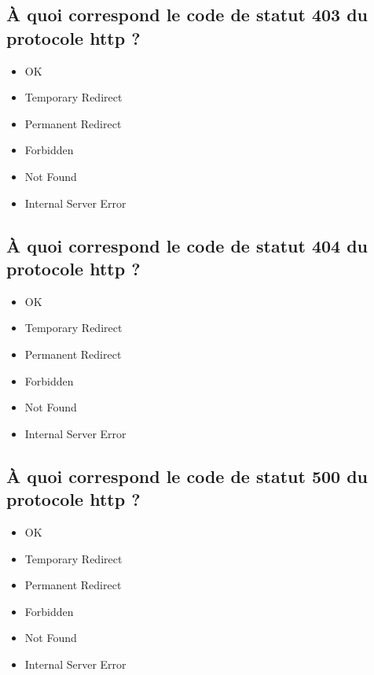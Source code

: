 \documentclass[11pt,a4paper]{article}
\begin{document}
\subsection{\`A quoi correspond le code de statut 403 du protocole http ?}

\begin{itemize}
\item[\CaseCoche] OK\\
\item[\CaseCoche] Temporary Redirect\\
\item[\CaseCoche] Permanent Redirect\\
\item[\CaseCoche] Forbidden\\  %
\item[\CaseCoche] Not Found\\
\item[\CaseCoche] Internal Server Error\\
\end{itemize}


\subsection{\`A quoi correspond le code de statut 404 du protocole http ?}

\begin{itemize}
\item[\CaseCoche] OK\\
\item[\CaseCoche] Temporary Redirect\\
\item[\CaseCoche] Permanent Redirect\\
\item[\CaseCoche] Forbidden\\
\item[\CaseCoche] Not Found\\  %
\item[\CaseCoche] Internal Server Error\\
\end{itemize}


\subsection{\`A quoi correspond le code de statut 500 du protocole http ?}

\begin{itemize}
\item[\CaseCoche] OK\\
\item[\CaseCoche] Temporary Redirect\\
\item[\CaseCoche] Permanent Redirect\\
\item[\CaseCoche] Forbidden\\
\item[\CaseCoche] Not Found\\
\item[\CaseCoche] Internal Server Error\\  %
\end{itemize}
\end{document}
